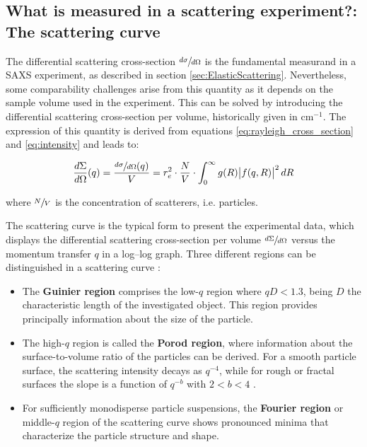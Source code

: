 \subsection{What is measured in a scattering experiment?: The scattering curve}

The differential scattering cross-section $\sfrac{d\sigma}{d\Omega}$ is the fundamental measurand in a SAXS experiment, as described in section \ref{sec:ElasticScattering}. Nevertheless, some comparability challenges arise from this quantity as it depends on the sample volume used in the experiment. This can be solved by introducing the differential scattering cross-section per volume, historically given in cm$^{-1}$. The expression of this quantity is derived from equations \ref{eq:rayleigh_cross_section} and \ref{eq:intensity} and leads to:

\begin{equation}
        \frac{d\Sigma}{d\Omega} (q) = \frac{\sfrac{d\sigma}{d\Omega}(q)}{V} = r_e^2 \cdot \frac{N}{V} \cdot \int_0^{\infty} g(R) \abs{ f(q,R) }^2 dR
\end{equation}

where $\sfrac{N}{V}$ is the concentration of scatterers, i.e. particles.

The scattering curve is the typical form to present the experimental data, which displays the differential scattering cross-section per volume $\sfrac{d\Sigma}{d\Omega}$ versus the momentum transfer $q$ in a log–log graph. Three different regions can be distinguished in a scattering curve \citep{schnablegger_practical_2006}: 

\begin{itemize}
        \item The \textbf{Guinier region} comprises the low-$q$ region where $qD<1.3$\citep{feigin_structure_1987}, being $D$ the characteristic length of the investigated object. This region provides principally information about the size of the particle.
        \item The high-$q$ region is called the \textbf{Porod region}, where information about the surface-to-volume ratio of the particles can be derived. For a smooth particle surface, the scattering intensity decays as $q^{-4}$, while for rough or fractal surfaces the slope is a function of $q^{-b}$ with $2<b<4$ \citep{walenta_small_1985-1}.
        \item For sufficiently monodisperse particle suspensions, the \textbf{Fourier region} or middle-$q$ region of the scattering curve shows pronounced minima that characterize the particle structure and shape.

\end{itemize}

